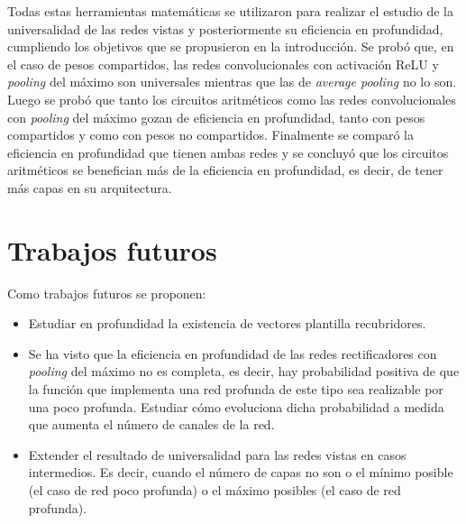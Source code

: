 Todas estas herramientas matemáticas se utilizaron para realizar el estudio de la universalidad de las redes vistas y posteriormente su eficiencia en profundidad, cumpliendo los objetivos que se propusieron en la introducción. Se probó que, en el caso de pesos compartidos, las redes convolucionales con activación ReLU y \textit{pooling} del máximo son universales mientras que las de \textit{average pooling} no lo son. Luego se probó que tanto los circuitos aritméticos como las redes convolucionales con \textit{pooling} del máximo gozan de eficiencia en profundidad, tanto con pesos compartidos y como con pesos no compartidos. Finalmente se comparó la eficiencia en profundidad que tienen ambas redes y se concluyó que los circuitos aritméticos se benefician más de la eficiencia en profundidad, es decir, de tener más capas en su arquitectura.

\section{Trabajos futuros}
Como trabajos futuros se proponen:

\begin{itemize}
\item Estudiar en profundidad la existencia de vectores plantilla recubridores.

\item Se ha visto que la eficiencia en profundidad de las redes rectificadores con \textit{pooling} del máximo no es completa, es decir, hay probabilidad positiva de que la función que implementa una red profunda de este tipo sea realizable por una poco profunda. Estudiar cómo evoluciona dicha probabilidad a medida que aumenta el número de canales de la red.

\item Extender el resultado de universalidad para las redes vistas en casos intermedios. Es decir, cuando el número de capas no son o el mínimo posible (el caso de red poco profunda) o el máximo posibles (el caso de red profunda).
\end{itemize}
